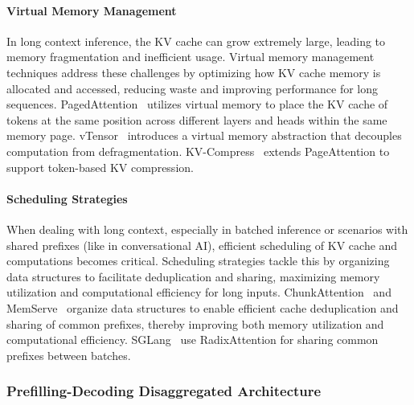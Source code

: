 \documentclass[11pt, a4paper, logo, copyright, nonumbering]{map}
\begin{document}
\paragraph{Virtual Memory Management}  In long context inference, the KV cache can grow extremely large, leading to memory fragmentation and inefficient usage. Virtual memory management techniques address these challenges by optimizing how KV cache memory is allocated and accessed, reducing waste and improving performance for long sequences. PagedAttention~\citep{kwon2023efficient} utilizes virtual memory to place the KV cache of tokens at the same position across different layers and heads within the same memory page. vTensor~\citep{xu2024vtensor} introduces a virtual memory abstraction that decouples computation from defragmentation. KV-Compress~\citep{rehg2024kv} extends PageAttention to support token-based KV compression. 
\paragraph{Scheduling Strategies}  When dealing with long context, especially in batched inference or scenarios with shared prefixes (like in conversational AI), efficient scheduling of KV cache and computations becomes critical.  Scheduling strategies tackle this by organizing data structures to facilitate deduplication and sharing, maximizing memory utilization and computational efficiency for long inputs. ChunkAttention~\citep{ye2024chunkattention} and MemServe~\citep{hu2024memserve} organize data structures to enable efficient cache deduplication and sharing of common prefixes, thereby improving both memory utilization and computational efficiency. SGLang~\citep{zheng2023efficiently} use RadixAttention for sharing common prefixes between batches.

\subsubsection{Prefilling-Decoding Disaggregated Architecture} 
\end{document}

